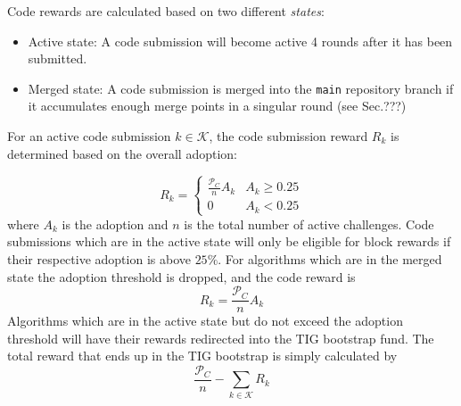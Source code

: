 \documentclass{contract}
\numberwithin{equation}{section}
\begin{document}
Code rewards are calculated based on two different \emph{states}:
\begin{itemize}
    \item Active state: A code submission will become active 4 rounds after it has been submitted.
    \item Merged state: A code submission is merged into the \texttt{main} repository branch if it accumulates enough merge points in a singular round (see Sec.???) 
\end{itemize}

For an active code submission $k\in\mathcal{K}$, the code submission reward $R_k$ is determined based on the overall adoption:

\begin{equation}
    R_k = 
    \begin{cases}
    \frac{\mathcal{P}_C}{n}A_k &  A_k \geq 0.25\\
    0 & A_k < 0.25
    \end{cases}
\end{equation}
where $A_k$ is the adoption and $n$ is the total number of active challenges. 
Code submissions which are in the active state will only be eligible for block rewards if their respective adoption is above $25\%$.
For  algorithms which are in the merged state the adoption threshold is dropped, and the code reward is 
\begin{equation}
    R_k = \frac{\mathcal{P}_C}{n} A_k
\end{equation}
Algorithms which are in the active state but do not exceed the adoption threshold will have their rewards redirected into the TIG bootstrap fund. The total reward that ends up in the TIG bootstrap is simply calculated by 
$$
\frac{\mathcal{P}_C}{n} - \sum_{k\in \mathcal{K}}R_k
$$
\end{document}
